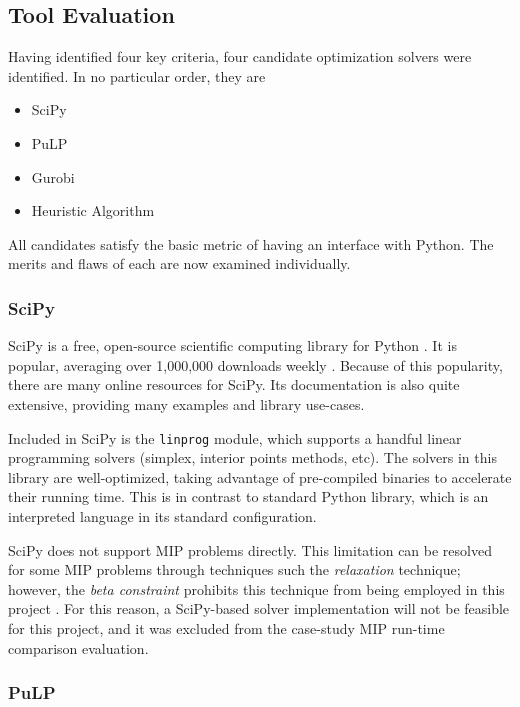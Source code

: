 \documentclass[../mthe-493-final-project.tex]{subfiles}
\begin{document}
    \subsection{Tool Evaluation}
    \label{ssec:optimization-tool-evaluation}
    
    Having identified four key criteria, four candidate optimization solvers were identified. In no particular order, they are
    \begin{itemize}
        \item SciPy
        \item PuLP
        \item Gurobi
        \item Heuristic Algorithm
    \end{itemize}
    All candidates satisfy the basic metric of having an interface with Python. The merits and flaws of each are now examined individually.
    
    \subsubsection{SciPy}
    \label{sssec:optimization-candidate-scipy}
    
    SciPy is a free, open-source scientific computing library for Python \cite{2020SciPy-NMeth}. It is popular, averaging over 1,000,000 downloads weekly \cite{flynn_2018_scipy}. Because of this popularity, there are many online resources for SciPy. Its documentation is also quite extensive, providing many examples and library use-cases.
    
    Included in SciPy is the \texttt{linprog} module, which supports a handful linear programming solvers (simplex, interior points methods, etc). The solvers in this library are well-optimized, taking advantage of pre-compiled binaries to accelerate their running time. This is in contrast to standard Python library, which is an interpreted language in its standard configuration.
    
    SciPy does not support MIP problems directly. This limitation can be resolved for some MIP problems through techniques such the \textit{relaxation} technique; however, the \textit{beta constraint} prohibits this technique from being employed in this project \cite{aps2020mosek}. For this reason, a SciPy-based solver implementation will not be feasible for this project, and it was excluded from the case-study MIP run-time comparison evaluation.
    
    \subsubsection{PuLP}
    \label{sssec:optimization-candidate-pulp}
    
\end{document}
